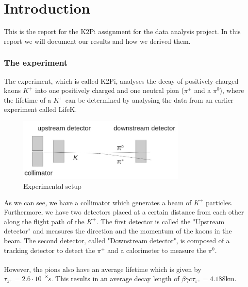\documentclass[a4paper,parskip,11pt, DIV12]{scrreprt}
\begin{document}
	\renewcommand{\chaptermark}[1]{ \markboth{#1}{} } %
	
	
	
	\chapter{Introduction}
	
	This is the report for the K2Pi assignment for the data analysis project. In this report we will document our results and how we derived them.
	
	\subsection*{The experiment}
	
	The experiment, which is called K2Pi, analyses the decay of positively charged kaons $K^+$ into one positively charged and one neutral pion ($\pi^+$ and a $\pi^0$), where the lifetime of a $K^+$ can be determined by analysing the data from an earlier experiment called LifeK.
	
	\begin{figure}[h] 
		\centering
		\includegraphics[width=0.75\textwidth]{ExperimentSetup.jpg} 
		\caption{Experimental setup}
		\label{fig:1}    
	\end{figure}
	
	As we can see, we have a collimator which generates a beam of $K^+$ particles. Furthermore, we have two detectors placed at a certain distance from each other along the flight path of the $K^+$. The first detector is called the "Upstream detector" and measures the direction and the momentum of the kaons in the beam. The second detector, called "Downstream detector", is composed of a tracking detector to detect the $\pi^+$ and a calorimeter to measure the $\pi^0$.
	\\
	\\
	However, the pions also have an average lifetime which is given by $\tau_{\pi^+} = 2.6 \cdot 10^{-8}s$. This results in an average decay length of $\beta \gamma c\tau_{\pi^+} = 4.188$km.
	
\end{document}
